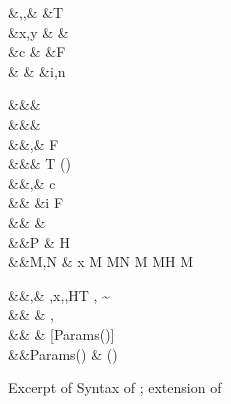 \documentclass[screen,nonacm]{acmart}
\begin{document}
 \begin{figure}[ht]
 \begin{syntax}
  &\TyVar,\beta,\Co &\qquad{} &T \\
  &x,y &\qquad{} &\shl{\NType} \\
  &c &\qquad{} &F\\
                      &  &\qquad{} &i,n \in {}\\
 \end{syntax}
 \begin{syntax}
    &&\rho \bnfeq& \\
    &&\kappa \bnfeq& \star \bnfor \kappa \to \kappa \bnfor \shl{\sigma \sim^\kappa_\rho \tau}\\
    &&\tau,\sigma \bnfeq& \TyVar \bnfor {} \bnfor \tau\App\tau \bnfor \Forall {\TyVar\co\kappa} \tau \bnfor F\\
     &&\TypeConst \bnfeq& T \bnfor (\to) \bnfor \shl{\NType}\\
  &&\nu,\Co \bnfeq& c \bnfor {}\tau \bnfor \Sym\Co \bnfor \trans\nu\Co %
 \bnfor \Forall {\TyVar\co\kappa} \Co \bnfor \Co\At\tau %
 \bnfor \nu\App\Co \\
                  &&              &\bnfor \Left \Co \bnfor \Right \Co \bnfor \Nth i \Co \bnfor \TypeConst\App\many\Co \bnfor F\many\Co \bnfor \shl{\SubCo \Co} \\  %
  && \phi \bnfeq& \tau \bnfor \Co\\
  &&P \bnfeq& H\App \many{\TyVar\co\kappa} \\
  &&M,N \bnfeq& x \bnfor {} M \bnfor M\App N \bnfor \TLam{\tau\co\kappa} M \bnfor M\App \tau \bnfor H \bnfor \Case M  \bnfor \Cast \Tm \Co
 \end{syntax}
 \begin{syntax}
  &&\TEnv,\Delta \bnfeq& \empt \bnfor \TEnv,x\co\tau \bnfor \TEnv,\TyVar\co\kappa \bnfor \TEnv,H\co T \bnfor \TEnv, \Co \co \tau\sim\sigma\\
  && \bnfeq& \empt \bnfor {},\alpha\co\rho\\
                     &&\roles{\TypeConst} \bnfeq& {[\rho \mid \alpha\co\rho \in Params(\TypeConst)]}\\
                     &&Params(\TypeConst) \bnfeq& \many\alpha\co\rho\quad  {} (\TypeConst\App\many\alpha) \co \star%
 \end{syntax}
 \caption{Excerpt of Syntax of \SFR; extension of \SFC}
 \label{fig:sfr-syntax}
 \end{figure}
\end{document}
